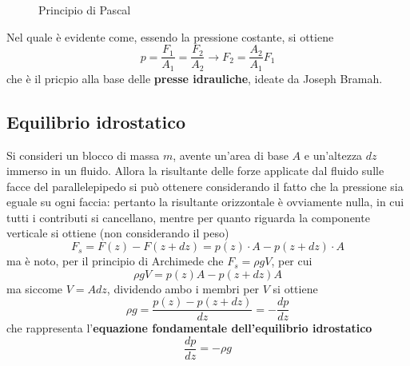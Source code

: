 \documentclass[a4paper]{extarticle}
\begin{document}
\begin{figure}[H]
  \caption{Principio di Pascal}
  \label{fig:princpio_Pascal}
\end{figure}

\noindent
Nel quale è evidente come, essendo la pressione costante, si ottiene
\[p=\frac{F_1}{A_1}=\frac{F_2}{A_2} \longrightarrow F_2=\frac{A_2}{A_1} F_1\]
che è il pricpio alla base delle \textbf{presse idrauliche}, ideate da Joseph Bramah.

\vspace{1em}
\subsection{Equilibrio idrostatico}
Si consideri un blocco di massa $m$, avente un'area di base $A$ e un'altezza $dz$ immerso in un fluido. Allora la risultante delle forze applicate dal fluido sulle facce del parallelepipedo si può ottenere considerando il fatto che la pressione sia eguale su ogni faccia: pertanto la risultante orizzontale è ovviamente nulla, in cui tutti i contributi si cancellano, mentre per quanto riguarda la componente verticale si ottiene (non considerando il peso)
\[F_s = F(z) - F(z+dz) = p(z) \cdot A - p(z+dz) \cdot A\]
ma è noto, per il principio di Archimede che $F_s = \rho g V$, per cui
\[\rho g V = p(z) A - p(z + dz) A\]
ma siccome $V=A dz$, dividendo ambo i membri per $V$ si ottiene
\[\rho g = \frac{p(z) - p(z+dz)}{dz} = - \frac{dp}{dz}\]
che rappresenta l'\textbf{equazione fondamentale dell'equilibrio idrostatico}
\[\boxed{\frac{dp}{dz}=-\rho g}\]
\end{document}
